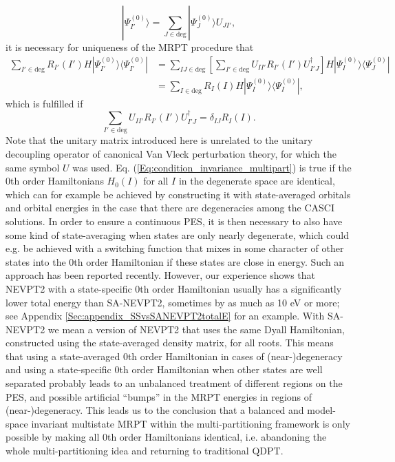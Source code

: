 	\begin{equation}
	|\Psi _{I'}^{(0)}\rangle  = \sum\limits_{J \in {\text{deg}}} | \Psi _J^{(0)}\rangle {U_{JI'}},
	\end{equation}
it is necessary for uniqueness of the MRPT procedure that
	\begin{equation}
	\begin{split}
	\sum\limits_{I' \in {\text{deg}}} {{R_{I'}}} (I')H|\Psi _{I'}^{(0)}\rangle \langle \Psi _{I'}^{(0)}| &= \sum\limits_{IJ \in {\text{deg}}} {\left[ {\sum\limits_{I' \in {\text{deg}}} {{U_{II'}}} {R_{I'}}(I')U_{I'J}^\dag } \right]} H|\Psi _I^{(0)}\rangle \langle \Psi _J^{(0)}| \\
	&= \sum\limits_{I \in {\text{deg}}} {{R_I}} (I)H|\Psi _I^{(0)}\rangle \langle \Psi _I^{(0)}|,
	\end{split}
\end{equation}
which is fulfilled if
	\begin{equation}
	\label{Eq:condition_invariance_multipart}
	\sum\limits_{I' \in {\text{deg}}} {{U_{II'}}} {R_{I'}}(I')U_{I'J}^\dag  = {\delta _{IJ}}{R_I}(I).
	\end{equation}
Note that the unitary matrix introduced here is unrelated to the unitary decoupling operator of canonical Van Vleck perturbation theory, for which the same symbol $U$ was used. Eq. (\ref{Eq:condition_invariance_multipart}) is true if the 0th order Hamiltonians $H_0(I)$ for all $I$ in the degenerate space are identical, which can for example be achieved by constructing it with state-averaged orbitals and orbital energies in the case that there are degeneracies among the CASCI solutions. In order to ensure a continuous PES, it is then necessary to also have some kind of state-averaging when states are only nearly degenerate, which could e.g. be achieved with a switching function that mixes in some character of other states into the 0th order Hamiltonian if these states are close in energy. Such an approach has been reported recently.\cite{LiLE_2019_144107} However, our experience shows that NEVPT2 with a state-specific 0th order Hamiltonian usually has a significantly lower total energy than SA-NEVPT2, sometimes by as much as 10 eV or more; see Appendix \ref{Sec:appendix_SSvsSANEVPT2totalE} for an example. With SA-NEVPT2 we mean a version of NEVPT2 that uses the same Dyall Hamiltonian, constructed using the state-averaged density matrix, for all roots.
This means that using a state-averaged 0th order Hamiltonian in cases of (near-)degeneracy and using a state-specific 0th order Hamiltonian when other states are well separated probably leads to an unbalanced treatment of different regions on the PES, and possible artificial “bumps” in the MRPT energies in regions of (near-)degeneracy. This leads us to the conclusion that a balanced and model-space invariant multistate MRPT within the multi-partitioning framework is only possible by making all 0th order Hamiltonians identical, i.e. abandoning the whole multi-partitioning idea and returning to traditional QDPT.

